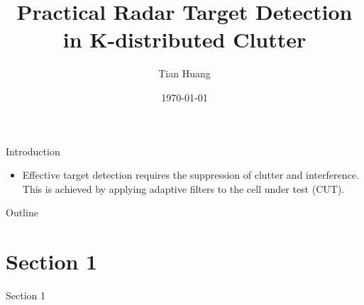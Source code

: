 \documentclass[aspectratio=1610]{beamer}
\title{Practical Radar Target Detection in K-distributed Clutter}
\author{Tian Huang}
\date\today
\begin{document}
\begin{frame}[plain]
  \titlepage
\end{frame}

\begin{frame}{Introduction}
    \begin{itemize}
        \item Effective target detection requires the suppression of clutter and interference. This is achieved by applying adaptive filters to the cell under test (CUT).
    \end{itemize}
\end{frame}

\begin{frame}{Outline}
  \tableofcontents  
\end{frame}

\section{Section 1}
\begin{frame}{Section 1}
    
\end{frame}












\end{document}
